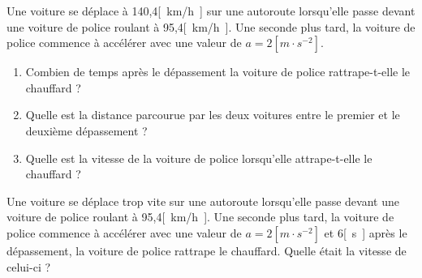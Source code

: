 \begin{exercise}[difficulty=***]
  Une voiture se déplace à 140,4\unit{[km/h]} sur une autoroute lorsqu'elle passe devant une voiture de police roulant à 95,4\unit{[km/h]}. Une seconde plus tard, la voiture de police commence à accélérer avec une valeur de \(a=2\unit{[m \cdot s^{-2}]}\).
  \begin{enumerate}[label=\alph*)]
    \item Combien de temps après le dépassement la voiture de police rattrape-t-elle le chauffard ?
    \item Quelle est la distance parcourue par les deux voitures entre le premier et le deuxième dépassement ?
    \item Quelle est la vitesse de la voiture de police lorsqu'elle attrape-t-elle le chauffard ?
  \end{enumerate}
\end{exercise}

\begin{exercise}[difficulty=***]
  Une voiture se déplace trop vite sur une autoroute lorsqu'elle passe devant une voiture de police roulant à 95,4\unit{[km/h]}. Une seconde plus tard, la voiture de police commence à accélérer avec une valeur de \(a=2\unit{[m \cdot s^{-2}]}\) et 6\unit{[s]} après le dépassement, la voiture de police rattrape le chauffard.
  Quelle était la vitesse de celui-ci ?
\end{exercise}

